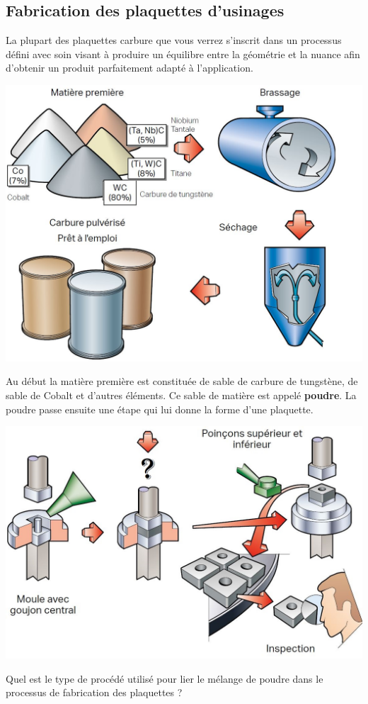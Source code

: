 \documentclass[12pt]{article}
\newcounter{exo}
\newenvironment{exo}{\stepcounter{exo}\vspace{0.5cm}{\bfseries Question \theexo\ :}}{\par\vspace{0.5cm}}
\begin{document}
\subsection{Fabrication des plaquettes d'usinages}
La plupart des plaquettes carbure que vous verrez s'inscrit dans un processus défini avec soin visant à produire un équilibre entre la géométrie et la nuance afin d'obtenir un produit parfaitement adapté à l'application.

\begin{center}
\includegraphics[width=0.6\linewidth]{Images/PLA11.JPG}
\end{center}

Au début la matière première est constituée de sable de carbure de tungstène, de sable de Cobalt et d'autres éléments. Ce sable de matière est appelé \textbf{poudre}. La poudre passe ensuite une étape qui lui donne la forme d'une plaquette.



\begin{center}
\includegraphics[width=0.7\linewidth]{Images/PLA12.JPG}
\end{center}

\begin{exo} Quel est le type de procédé utilisé pour lier le mélange de poudre dans le processus de fabrication des plaquettes ?\end{exo}
\end{document}
